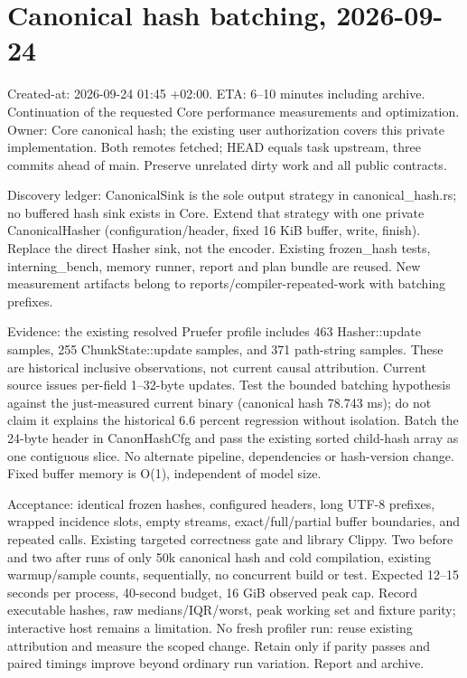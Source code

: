 \documentclass[11pt,a4paper]{article}
\begin{document}
\section*{Canonical hash batching, 2026-09-24}
Created-at: 2026-09-24 01:45 +02:00. ETA: 6--10 minutes including archive.
Continuation of the requested Core performance measurements and optimization.
Owner: Core canonical hash; the existing user authorization covers this private
implementation. Both remotes fetched; HEAD equals task upstream, three commits
ahead of main. Preserve unrelated dirty work and all public contracts.

Discovery ledger: CanonicalSink is the sole output strategy in canonical\_hash.rs;
no buffered hash sink exists in Core. Extend that strategy with one private
CanonicalHasher (configuration/header, fixed 16 KiB buffer, write, finish).
Replace the direct Hasher sink, not the encoder. Existing frozen\_hash tests,
interning\_bench, memory runner, report and plan bundle are reused. New measurement
artifacts belong to reports/compiler-repeated-work with batching prefixes.

Evidence: the existing resolved Pruefer profile includes 463 Hasher::update
samples, 255 ChunkState::update samples, and 371 path-string samples. These are
historical inclusive observations, not current causal attribution. Current
source issues per-field 1--32-byte updates. Test the bounded batching hypothesis
against the just-measured current binary (canonical hash 78.743 ms); do not claim
it explains the historical 6.6 percent regression without isolation.
Batch the 24-byte header in CanonHashCfg and pass the existing sorted child-hash
array as one contiguous slice. No alternate pipeline, dependencies or hash-version
change. Fixed buffer memory is O(1), independent of model size.

Acceptance: identical frozen hashes, configured headers, long UTF-8 prefixes,
wrapped incidence slots, empty streams, exact/full/partial buffer boundaries,
and repeated calls. Existing targeted correctness gate and library Clippy.
Two before and two after runs of only 50k canonical hash and cold compilation,
existing warmup/sample counts, sequentially, no concurrent build or test.
Expected 12--15 seconds per process, 40-second budget, 16 GiB observed peak cap.
Record executable hashes, raw medians/IQR/worst, peak working set and fixture
parity; interactive host remains a limitation. No fresh profiler run: reuse
existing attribution and measure the scoped change. Retain only if parity passes
and paired timings improve beyond ordinary run variation. Report and archive.
\end{document}
